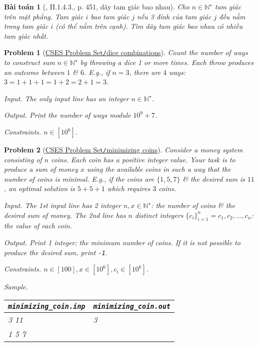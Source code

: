 \documentclass{article}
\newtheorem{baitoan}{Bài toán}
\newtheorem{problem}{Problem}
\begin{document}
\begin{baitoan}[\cite{Thu_Phuong_Tien_Triet_Phuong_KTLT}, II.1.4.3., p. 451, dãy tam giác bao nhau]
	Cho $n\in\mathbb{N}^\star$ tam giác trên mặt phẳng. Tam giác $i$ bao tam giác $j$ nếu 3 đỉnh của tam giác $j$ đều nằm trong tam giác $i$ (có thể nằm trên cạnh). Tìm dãy tam giác bao nhau có nhiều tam giác nhất.
\end{baitoan}

\begin{problem}[\href{https://cses.fi/problemset/task/1633}{CSES Problem Set{\tt/}dice combinations}]
	Count the number of ways to construct sum $n\in\mathbb{N}^\star$ by throwing a dice 1 or more times. Each throw produces an outcome between $1$ \& $6$. E.g., if $n = 3$, there are $4$ ways: $3 = 1 + 1 + 1 = 1 + 2 = 2 + 1 = 3$.
	\item {\sf Input.} The only input line has an integer $n\in\mathbb{N}^\star$.
	\item {\sf Output.} Print the number of ways module $10^9 + 7$.
	\item {\sf Constraints.} $n\in[10^6]$.
\end{problem}

\begin{problem}[\href{https://cses.fi/problemset/task/1634}{CSES Problem Set{\tt/}minimizing coins}]
	Consider a money system consisting of $n$ coins. Each coin has a positive integer value. Your task is to produce a sum of money $x$ using the available coins in such a way that the number of coins is minimal. E.g., if the coins are $\{1,5,7\}$ \& the desired sum is $11$, an optimal solution is $5 + 5 + 1$ which requires $3$ coins.
	\item {\sf Input.} The 1st input line has 2 integer $n,x\in\mathbb{N}^\star$: the number of coins \& the desired sum of money. The 2nd line has $n$ distinct integers $\{c_i\}_{i=1}^n = c_1,c_2,\ldots,c_n$: the value of each coin.
	\item {\sf Output.} Print 1 integer: the minimum number of coins. If it is not possible to produce the desired sum, print {\tt-1}.
	\item {\sf Constraints.} $n\in[100],x\in[10^6],c_i\in[10^6]$.
	\item {\sf Sample.}
	\begin{table}[H]
		\centering
		\begin{tabular}{|l|l|}
			\hline
			\verb|minimizing_coin.inp| & \verb|minimizing_coin.out| \\
			\hline
			3 11 & 3 \\
			1 5 7 & \\
			\hline
		\end{tabular}
	\end{table}
\end{problem}
\end{document}
